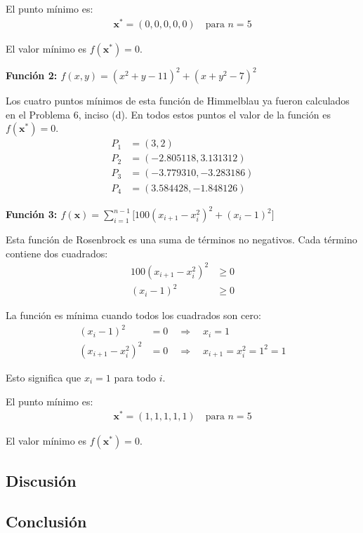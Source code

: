 \documentclass{article}
\begin{document}
El punto mínimo es:
\begin{align}
\mathbf{x}^* = (0, 0, 0, 0, 0) \quad \text{para } n = 5
\end{align}

El valor mínimo es $f(\mathbf{x}^*) = 0$.

\textbf{Función 2: $f(x,y) = (x^{2}+y-11)^{2} + (x+y^{2}-7)^{2}$}

Los cuatro puntos mínimos de esta función de Himmelblau ya fueron calculados en el Problema 6, inciso (d). En todos estos puntos el valor de la función es $f(\mathbf{x}^*) = 0$.
\begin{align}
P_1 &= (3, 2) \\
P_2 &= (-2.805118, 3.131312) \\
P_3 &= (-3.779310, -3.283186) \\
P_4 &= (3.584428, -1.848126)
\end{align}

\textbf{Función 3: $f(\mathbf{x}) = \sum_{i=1}^{n-1} \bigl[100(x_{i+1}-x_i^{2})^{2} + (x_i-1)^{2}\bigr]$}

Esta función de Rosenbrock es una suma de términos no negativos. Cada término contiene dos cuadrados:
\begin{align}
100(x_{i+1} - x_i^2)^2 &\geq 0 \\
(x_i - 1)^2 &\geq 0
\end{align}

La función es mínima cuando todos los cuadrados son cero:
\begin{align}
(x_i - 1)^2 &= 0 \quad \Rightarrow \quad x_i = 1 \\
(x_{i+1} - x_i^2)^2 &= 0 \quad \Rightarrow \quad x_{i+1} = x_i^2 = 1^2 = 1
\end{align}

Esto significa que $x_i = 1$ para todo $i$.

El punto mínimo es:
\begin{align}
\mathbf{x}^* = (1, 1, 1, 1, 1) \quad \text{para } n = 5
\end{align}

El valor mínimo es $f(\mathbf{x}^*) = 0$.

\subsection{Discusión}

\subsection{Conclusión}
\end{document}
